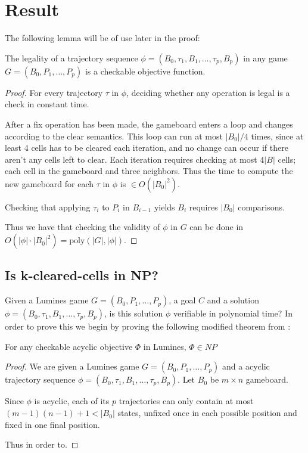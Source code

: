 \section{Result}
The following lemma will be of use later in the proof:\\

\begin{lem}
\label{lem:legality}
The legality of a trajectory sequence $\phi=(B_0, \tau_1, B_1, \ldots ,\tau_p, B_p)$ in any game $G=(B_0, P_1, \ldots, P_p)$ is a checkable objective function.
\end{lem}

\begin{proof}
For every trajectory $\tau$ in $\phi$, deciding whether any operation is legal is a check in constant time.

After a fix operation has been made, the gameboard enters a loop and changes according to the clear semantics. This loop can run at most $|B_0| / 4$ times, since at least 4 cells has to be cleared each iteration, and no change can occur if there aren't any cells left to clear. Each iteration requires checking at most $4|B|$ cells; each cell in the gameboard and three neighbors. Thus the time to compute the new gameboard for each $\tau$ in $\phi$ is $\in O(|B_0|^2)$.

Checking that applying $\tau_i$ to $P_i$ in $B_{i-1}$ yields $B_i$ requires $|B_0|$ comparisons. 

Thus we have that checking the validity of $\phi$ in $G$ can be done in $O(|\phi| \cdot |B_0|^2) = \text{poly}(|G|, |\phi|)$. 
\end{proof}

\subsection{Is k-cleared-cells in NP?}

Given a Lumines game $G = (B_0, P_1, \ldots, P_p)$, a goal $C$ and a solution $\phi = (B_0, \tau_1, B_1, \ldots ,\tau_p, B_p)$, is this solution $\phi$ verifiable in polynomial time? In order to prove this we begin by proving the following modified theorem from \cite{tetris}: \\

\begin{thm}
    For any checkable acyclic objective $\Phi$ in Lumines, $\Phi \in NP$
\end{thm}

\begin{proof}
We are given a Lumines game $G = (B_0, P_1, \ldots, P_p)$ and a acyclic trajectory sequence $\phi = (B_0, \tau_1, B_1, \ldots ,\tau_p, B_p)$. Let $B_0$ be $m \times n$ gameboard.

Since $\phi$ is acyclic, each of its $p$ trajectories can only contain at most $(m-1)(n-1) + 1 < |B_0|$ states, unfixed once in each possible position and fixed in one final position. 

Thus in order to.
\end{proof}
